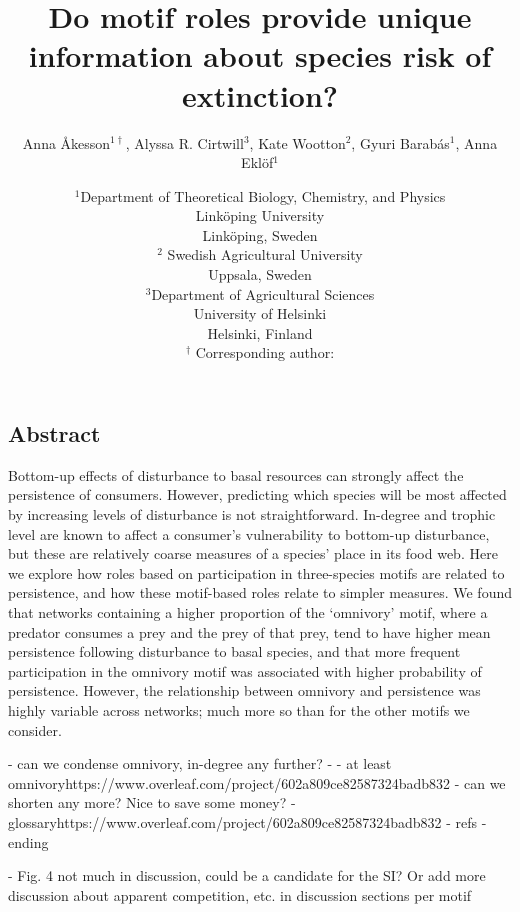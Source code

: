\documentclass[12pt]{article}
\title{Do motif roles provide unique information about species risk of extinction?}
\author{Anna \r{A}kesson$^{1\dagger}$, Alyssa R. Cirtwill$^{3}$, Kate Wootton$^{2}$, Gyuri Barab\'{a}s$^{1}$, Anna Ekl\"{o}f$^{1}$}
\date{\small$^1$Department of Theoretical Biology, Chemistry, and Physics\\ 
Link\"{o}ping University\\
Link\"{o}ping, Sweden\\
\medskip
\small$^2$ Swedish Agricultural University\\
Uppsala, Sweden\\
\medskip
\small$^3$Department of Agricultural Sciences\\
University of Helsinki\\
Helsinki, Finland\\
\medskip
$^\dagger$ Corresponding author:\\
}
\begin{document}
 
\maketitle 
\raggedright

\setlength{\parindent}{15pt} 
\begin{spacing}{2.0}



\section*{Abstract}

    Bottom-up effects of disturbance to basal resources can strongly affect the persistence of consumers.
    However, predicting which species will be most affected by increasing levels of disturbance is not straightforward.
    In-degree and trophic level are known to affect a consumer's vulnerability to bottom-up disturbance, but these are relatively coarse measures of a species' place in its food web.
    Here we explore how roles based on participation in three-species motifs are related to persistence, and how these motif-based roles relate to simpler measures.
    We found that networks containing a higher proportion of the `omnivory' motif, where a predator consumes a prey and the prey of that prey, tend to have higher mean persistence following disturbance to basal species, and that more frequent participation in the omnivory motif was associated with higher probability of persistence.
    However, the relationship between omnivory and persistence was highly variable across networks; much more so than for the other motifs we consider.

    - can we condense omnivory, in-degree any further?
    - - at least omnivoryhttps://www.overleaf.com/project/602a809ce82587324badb832
    - can we shorten any more? Nice to save some money?
    - glossaryhttps://www.overleaf.com/project/602a809ce82587324badb832
    - refs
    - ending

    - Fig. 4 not much in discussion, could be a candidate for the SI? Or add more discussion about apparent competition, etc. in discussion sections per motif

\clearpage

\end{spacing}
\end{document}
